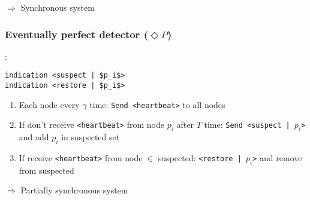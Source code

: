 $\Rightarrow$ Synchronous system

\subsubsection{Eventually perfect detector ($\Diamond P$)}:

\begin{lstlisting}[caption={Eventually Perfect detector}, mathescape, captionpos=b]
indication <suspect | $p_i$>
indication <restore | $p_i$>
\end{lstlisting}

\begin{enumerate}
    \item Each node every $\gamma$ time: \texttt{Send <heartbeat>} to all nodes
    \item If don't receive \texttt{<heartbeat>} from node $p_i$ after $T$ time:
    \texttt{Send <suspect | $p_i$>} and add $p_i$ in suspected set
    \item If receive \texttt{<heartbeat>} from node $\in$ suspected:
    \texttt{<restore | $p_i$>} and remove from suspected
\end{enumerate}

$\Rightarrow$ Partially synchronous system
